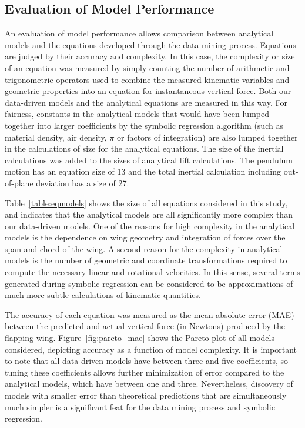\documentclass[fleqn,10pt]{wlscirep}
\begin{document}
\subsection{Evaluation of Model Performance}
An evaluation of model performance allows comparison between analytical models and the equations developed through the data mining process.  Equations are judged by their accuracy and complexity.  In this case, the complexity or size of an equation was measured by simply counting the number of arithmetic and trigonometric operators used to combine the measured kinematic variables and geometric properties into an equation for instantaneous vertical force.  Both our data-driven models and the analytical equations are measured in this way.  For fairness, constants in the analytical models that would have been lumped together into larger coefficients by the symbolic regression algorithm (such as material density, air density, \(\pi\) or factors of integration) are also lumped together in the calculations of size for the analytical equations.  The size of the inertial calculations was added to the sizes of analytical lift calculations.  The 
pendulum motion has an equation size of 13 and the total inertial calculation including out-of-plane deviation has a size of 27.

Table~\ref{table:eqmodels} shows the size of all equations considered in this study, and indicates that the analytical models are all significantly more complex than our data-driven models.  One of the reasons for high complexity in the analytical models is the dependence on wing geometry and integration of forces over the span and chord of the wing.  A second reason for the complexity in analytical models is the number of geometric and coordinate transformations required to compute the necessary linear and rotational velocities.  In this sense, several terms generated during symbolic regression can be considered to be approximations of much more subtle calculations of kinematic quantities.

The accuracy of each equation was measured as the mean absolute error (MAE) between the predicted and actual vertical force (in Newtons) produced by the flapping wing.  Figure~\ref{fig:pareto_mae} shows the Pareto plot of all models considered, depicting accuracy as a function of model complexity. It is important to note that all data-driven models have between three and five coefficients, so tuning these coefficients allows further minimization of error compared to the analytical models, which have between one and three.  Nevertheless, discovery of models with smaller error than theoretical predictions that are simultaneously much simpler is a significant feat for the data mining process and symbolic regression.
\end{document}
